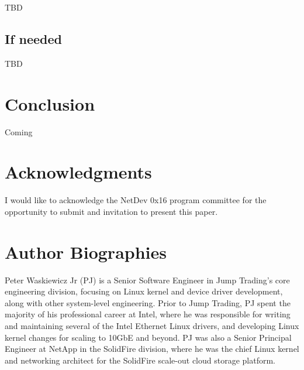 \documentclass[letterpaper]{article}
\begin{document}
TBD

\subsection{If needed}

TBD

\section{Conclusion}
Coming

\section{Acknowledgments}
I would like to acknowledge the NetDev 0x16 program committee for the opportunity to submit and invitation to present this paper.




\section{Author Biographies}
Peter Waskiewicz Jr (PJ) is a Senior Software Engineer in Jump Trading's core engineering division, focusing on Linux kernel and device driver development, along with other system-level engineering.  Prior to Jump Trading, PJ spent the majority of his professional career at Intel, where he was responsible for writing and maintaining several of the Intel Ethernet Linux drivers, and developing Linux kernel changes for scaling to 10GbE and beyond.  PJ was also a Senior Principal Engineer at NetApp in the SolidFire division, where he was the chief Linux kernel and networking architect for the SolidFire scale-out cloud storage platform.
\end{document}
